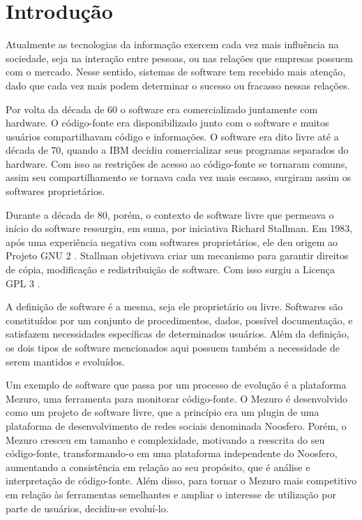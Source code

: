 \chapter{Introdução}
\label{cap-introducao}

Atualmente as tecnologias da informação exercem cada vez mais influência na sociedade, seja na interação entre pessoas, ou nas relações que empresas possuem com o mercado. Nesse sentido, sistemas de software tem recebido mais atenção, dado que cada vez mais podem determinar o sucesso ou fracasso nessas relações.

Por volta da década de 60 o software era comercializado juntamente com hardware. O código-fonte era disponibilizado junto com o software e muitos usuários compartilhavam código e informações. O software era dito livre até a década de 70, quando a IBM decidiu comercializar seus programas separados do hardware. Com isso as restrições de acesso ao código-fonte se tornaram comuns, assim seu compartilhamento se tornava cada vez mais escasso, surgiram assim os softwares proprietários.

Durante a década de 80, porém, o contexto de software livre que permeava o início do software ressurgiu, em suma, por iniciativa Richard Stallman. Em 1983, após uma experiência negativa com softwares proprietários, ele deu origem ao Projeto GNU 2 . Stallman objetivava criar um mecanismo para garantir direitos de cópia, modificação e redistribuição de software. Com isso surgiu a Licença GPL 3 .

A definição de software é a mesma, seja ele proprietário ou livre. Softwares são constituídos por um conjunto de procedimentos, dados, possível documentação, e satisfazem necessidades específicas de determinados usuários. Além da definição, os dois tipos de software mencionados aqui possuem também a necessidade de serem mantidos e evoluídos.

Um exemplo de software que passa por um processo de evolução é a plataforma Mezuro, uma ferramenta para monitorar código-fonte. O Mezuro é desenvolvido como um projeto de software livre, que a princípio era um plugin de uma plataforma de desenvolvimento de redes sociais denominada Noosfero. Porém, o Mezuro cresceu em tamanho e complexidade, motivando a reescrita do seu código-fonte, transformando-o em uma plataforma independente do Noosfero, aumentando a consistência em relação ao seu propósito, que é análise e interpretação de código-fonte. Além disso,  para tornar o Mezuro mais competitivo em relação às ferramentas semelhantes e ampliar o interesse de utilização por parte de usuários, decidiu-se evoluí-lo.

